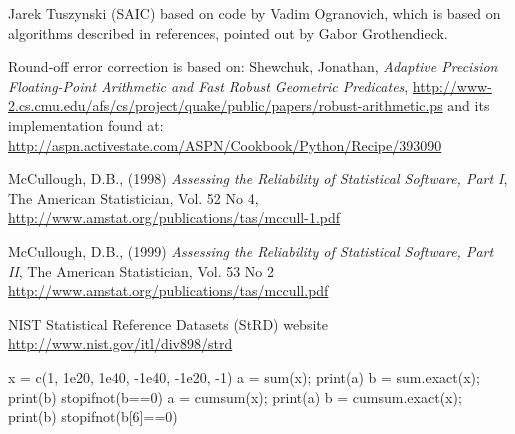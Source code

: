 \begin{Author}\relax
Jarek Tuszynski (SAIC)  based on
code by Vadim Ogranovich, which is based on algorithms described in 
references, pointed out by Gabor Grothendieck.
\end{Author}
\begin{References}\relax
Round-off error correction is based on:
Shewchuk, Jonathan, \emph{Adaptive Precision Floating-Point Arithmetic and  
Fast Robust Geometric Predicates},  
\url{http://www-2.cs.cmu.edu/afs/cs/project/quake/public/papers/robust-arithmetic.ps}
and its implementation found at:
\url{http://aspn.activestate.com/ASPN/Cookbook/Python/Recipe/393090} 

McCullough, D.B., (1998) \emph{Assessing the Reliability of Statistical 
Software, Part I}, The American Statistician, Vol. 52 No 4, 
\url{http://www.amstat.org/publications/tas/mccull-1.pdf}

McCullough, D.B., (1999) \emph{Assessing the Reliability of Statistical 
Software, Part II}, The American Statistician, Vol. 53 No 2
\url{http://www.amstat.org/publications/tas/mccull.pdf}

NIST Statistical Reference Datasets (StRD) website 
\url{http://www.nist.gov/itl/div898/strd}
\end{References}
\begin{SeeAlso}\relax
{}
\end{SeeAlso}
\begin{Examples}
\begin{ExampleCode}
  x = c(1, 1e20, 1e40, -1e40, -1e20, -1)
  a = sum(x);          print(a)
  b = sum.exact(x);    print(b)
  stopifnot(b==0)
  a = cumsum(x);       print(a)
  b = cumsum.exact(x); print(b)
  stopifnot(b[6]==0)
\end{ExampleCode}
\end{Examples}

